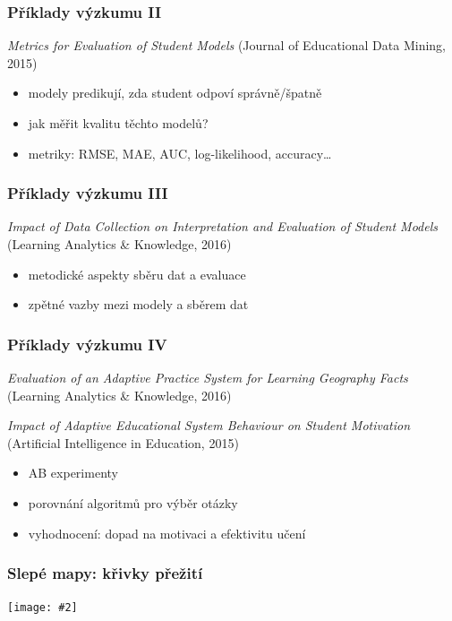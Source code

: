 \documentclass[bigger]{beamer}
\newcommand{\img}[2]{\begin{center}\texttt{[image: \#2]}\end{center}}
\begin{document}
\begin{frame}
  \frametitle{Příklady výzkumu II}

  \emph{Metrics for Evaluation of Student Models} (Journal of Educational Data
  Mining, 2015)

  \bigskip

  \begin{itemize}
  \item modely predikují, zda student odpoví správně/špatně
  \item jak měřit kvalitu těchto modelů?
  \item metriky: RMSE, MAE, AUC, log-likelihood, accuracy\ldots
  \end{itemize}
\end{frame}

\begin{frame}
  \frametitle{Příklady výzkumu III}

  \emph{Impact of Data Collection on Interpretation and Evaluation of Student
    Models} (Learning Analytics \& Knowledge, 2016)

  \bigskip

  \begin{itemize}
  \item metodické aspekty sběru dat a evaluace
  \item zpětné vazby mezi modely a sběrem dat
  \end{itemize}
\end{frame}

\begin{frame}
  \frametitle{Příklady výzkumu IV}

  \emph{Evaluation of an Adaptive Practice System for Learning Geography Facts}
  (Learning Analytics \& Knowledge, 2016)

  \emph{Impact of Adaptive Educational System Behaviour on Student Motivation } (Artificial Intelligence in Education, 2015)

  \bigskip

  \begin{itemize}
  \item AB experimenty
  \item porovnání algoritmů pro výběr otázky
  \item vyhodnocení: dopad na motivaci a efektivitu učení
  \end{itemize}
\end{frame}

\begin{frame}
  \frametitle{Slepé mapy: křivky přežití}

  \img{.95}{survival_curve_by_ab}
\end{frame}
\end{document}
